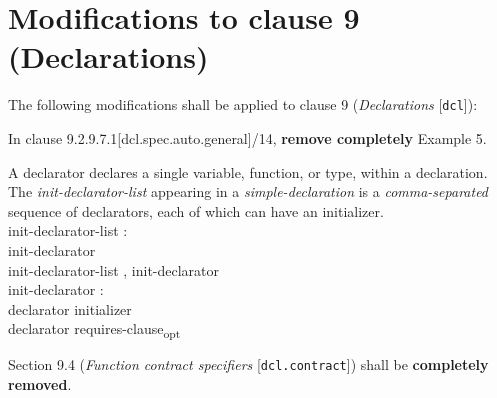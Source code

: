 \section{Modifications to clause 9 (Declarations)}

The following modifications shall be applied to clause 9 (\emph{Declarations}
[\texttt{dcl}]):

\begin{removal}
\newline
\end{removal}

\begin{noted}
In clause 9.2.9.7.1[dcl.spec.auto.general]/14, \textbf{remove completely} Example 5.
\end{noted}

\begin{modification}
 A declarator declares a single variable, function, or type, within a
declaration. The \emph{init-declarator-list} appearing in a
\emph{simple-declaration} is a \emph{comma-separated} sequence of declarators,
each of which can have an initializer.\\

init-declarator-list :\\
\tabto{1em}init-declarator\\
\tabto{1em}init-declarator-list , init-declarator\\

init-declarator :\\
\tabto{1em}declarator initializer\\
\tabto{1em}declarator requires-clause\textsubscript{opt}
\end{modification}

\begin{removal}
\end{removal}

\begin{removal}
Section 9.4 (\emph{Function contract specifiers} [\texttt{dcl.contract}]) shall be 
\textbf{completely removed}.
\end{removal}

